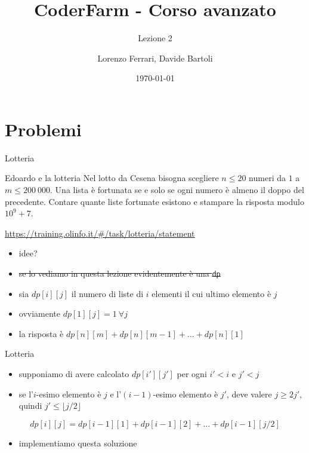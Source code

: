 \documentclass{beamer}
\title{CoderFarm - Corso avanzato}
\subtitle{Lezione 2}
\author{Lorenzo Ferrari, Davide Bartoli}
\date{\today}
\begin{document}
\begin{frame}
    \titlepage
\end{frame}

\section{Problemi}

\begin{frame}{Lotteria}{}
    \begin{exampleblock}{Edoardo e la lotteria}
        Nel lotto da Cesena bisogna scegliere $n \leq 20$ numeri da $1$ a $m \leq 200 \ 000$. Una lista \`e fortunata se e solo se ogni numero \`e almeno il doppo del precedente. Contare quante liste fortunate esistono e stampare la risposta modulo $10^9 + 7$.
    \end{exampleblock}
    \small{ \underline{\url{https://training.olinfo.it/\#/task/lotteria/statement}}}
    \pause
    \begin{itemize}
        \item idee?
        \pause
        \item \st{se lo vediamo in questa lezione evidentemente \`e una \texttt{dp}}
        \pause
        \item sia $dp[i][j]$ il numero di liste di $i$ elementi il cui ultimo elemento \`e $j$
        \pause
        \item ovviamente $dp[1][j] = 1 \ \forall j $
        \item la risposta \`e $dp[n][m] + dp[n][m-1] + \dots + dp[n][1]$
    \end{itemize}
\end{frame}

\begin{frame}{Lotteria}{}
    \begin{itemize}
        \item supponiamo di avere calcolato $dp[i'][j']$ per ogni $i' < i$ e $j' < j$
        \pause
        \item se l'$i$-esimo elemento \`e $j$ e l'$(i-1)$-esimo elemento \`e $j'$, deve valere $j \geq 2 j'$, quindi $j' \leq \lfloor j / 2 \rfloor$
    \end{itemize}
    \pause
    \vfill
    \[
        dp[i][j] = dp[i-1][1] + dp[i-1][2] + \dots + dp[i-1][j/2]
    \]
    \pause
    \vfill
    \begin{itemize}
        \item implementiamo questa soluzione
    \end{itemize}
\end{frame}
\end{document}

